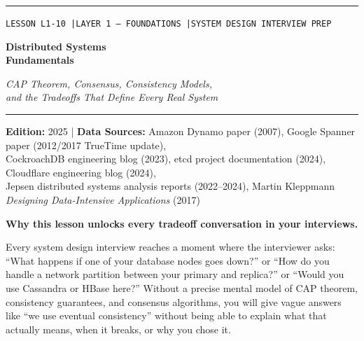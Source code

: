 \documentclass[11pt,a4paper]{article}
\begin{document}
\begin{titlepage}
\thispagestyle{empty}

\vspace*{1.5cm}

{\color{highlight!60}\rule{\linewidth}{1.2pt}}
\vspace{0.4cm}

{\fontsize{9}{11}\selectfont\color{primary!60}\texttt{LESSON L1-10 \quad|\quad LAYER 1 --- FOUNDATIONS \quad|\quad SYSTEM DESIGN INTERVIEW PREP}}

\vspace{0.6cm}

{\fontsize{30}{36}\selectfont\bfseries\color{primary}%
Distributed Systems\\
\color{highlight}Fundamentals}

\vspace{0.4cm}

{\fontsize{14}{18}\selectfont\color{primary!75}\itshape%
CAP Theorem, Consensus, Consistency Models,\\
and the Tradeoffs That Define Every Real System}

\vspace{0.3cm}
{\color{highlight!60}\rule{\linewidth}{0.6pt}}

\vspace{1.0cm}

{\small\color{primary!65}%
\textbf{Edition:} 2025 \quad|\quad
\textbf{Data Sources:} Amazon Dynamo paper (2007), Google Spanner paper (2012/2017 TrueTime update),\\
CockroachDB engineering blog (2023), etcd project documentation (2024), Cloudflare engineering blog (2024),\\
Jepsen distributed systems analysis reports (2022--2024), Martin Kleppmann \textit{Designing Data-Intensive Applications} (2017)
}

\vspace{1.2cm}

\begin{insightbox}
\textbf{Why this lesson unlocks every tradeoff conversation in your interviews.}

Every system design interview reaches a moment where the interviewer asks: ``What happens if one of your database nodes goes down?'' or ``How do you handle a network partition between your primary and replica?'' or ``Would you use Cassandra or HBase here?'' Without a precise mental model of CAP theorem, consistency guarantees, and consensus algorithms, you will give vague answers like ``we use eventual consistency'' without being able to explain what that actually means, when it breaks, or why you chose it.


\end{insightbox}
\end{titlepage}
\end{document}
